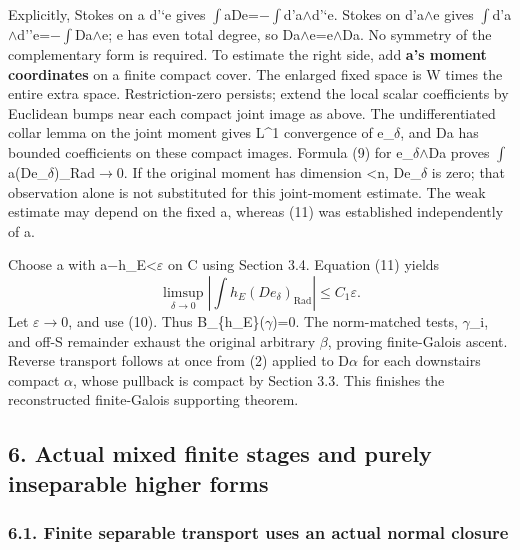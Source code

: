 \documentclass[
  10pt,
]{article}
\begin{document}
Explicitly, Stokes on a d'`e gives \ensuremath{\int}aDe=\ensuremath{-}\ensuremath{\int}d'a\ensuremath{\wedge}d'`e. Stokes on d'a\ensuremath{\wedge}e
gives \ensuremath{\int}d'a\ensuremath{\wedge}d''e=\ensuremath{-}\ensuremath{\int}Da\ensuremath{\wedge}e; e has even total degree, so Da\ensuremath{\wedge}e=e\ensuremath{\wedge}Da. No
symmetry of the complementary form is required. To estimate the right
side, add \textbf{a's moment coordinates} on a finite compact cover. The
enlarged fixed space is W times the entire extra space. Restriction-zero
persists; extend the local scalar coefficients by Euclidean bumps near
each compact joint image as above. The undifferentiated collar lemma on
the joint moment gives L\^{}1 convergence of e\_\ensuremath{\delta}, and Da has bounded
coefficients on these compact images. Formula (9) for e\_\ensuremath{\delta}\ensuremath{\wedge}Da proves
\ensuremath{\int}a(De\_\ensuremath{\delta})\_Rad\ensuremath{\to}0. If the original moment has dimension \textless n,
De\_\ensuremath{\delta} is zero; that observation alone is not substituted for this
joint-moment estimate. The weak estimate may depend on the fixed a,
whereas (11) was established independently of a.

Choose a with \textbar a\ensuremath{-}h\_E\textbar\textless \ensuremath{\varepsilon} on C using Section 3.4.
Equation (11) yields \[
 \limsup_{\delta\to0}\left|\int h_E(De_\delta)_{\mathrm{Rad}}\right|
                                      \le C_1\varepsilon.
\] Let \ensuremath{\varepsilon}\ensuremath{\to}0, and use (10). Thus B\_\{h\_E\}(\ensuremath{\gamma})=0. The norm-matched tests,
\ensuremath{\gamma}\_i, and off-S remainder exhaust the original arbitrary \ensuremath{\beta}, proving
finite-Galois ascent. Reverse transport follows at once from (2) applied
to D\ensuremath{\alpha} for each downstairs compact \ensuremath{\alpha}, whose pullback is compact by
Section 3.3. This finishes the reconstructed finite-Galois supporting
theorem.

\subsection{6. Actual mixed finite stages and purely inseparable higher
forms}\label{actual-mixed-finite-stages-and-purely-inseparable-higher-forms}

\subsubsection{6.1. Finite separable transport uses an actual normal
closure}\label{finite-separable-transport-uses-an-actual-normal-closure}
\end{document}
